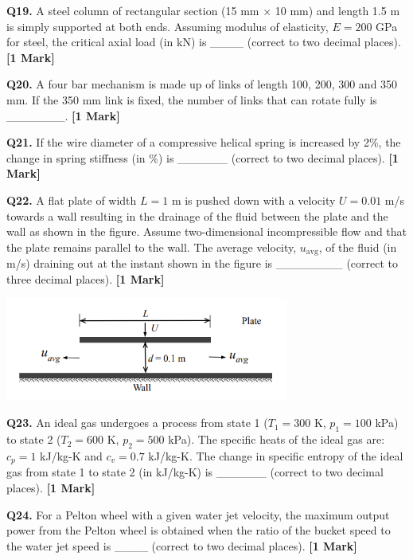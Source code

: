 \documentclass[11pt]{article}
\newcommand{\questiona}[2]{
    \noindent\textbf{Q#2.} #1 \hfill \textbf{[1 Mark]}
}
\begin{document}
\questiona{A steel column of rectangular section (15 mm × 10 mm) and length 1.5 m is simply supported at both ends. Assuming modulus of elasticity, \( E = 200 \) GPa for steel, the critical axial load (in kN) is \_\_\_\_ (correct to two decimal places).}{19}
\vspace{0.5cm}

\questiona{A four bar mechanism is made up of links of length 100, 200, 300 and 350 mm. If the 350 mm link is fixed, the number of links that can rotate fully is \_\_\_\_\_\_\_.}{20}
\vspace{0.5cm}

\questiona{If the wire diameter of a compressive helical spring is increased by 2\%, the change in spring stiffness (in \%) is \_\_\_\_\_\_ (correct to two decimal places).}{21}
\vspace{0.5cm}

\questiona{A flat plate of width \( L = 1 \) m is pushed down with a velocity \( U = 0.01 \) m/s towards a wall resulting in the drainage of the fluid between the plate and the wall as shown in the figure. Assume two-dimensional incompressible flow and that the plate remains parallel to the wall. The average velocity, \( u_{\text{avg}} \), of the fluid (in m/s) draining out at the instant shown in the figure is \_\_\_\_\_\_\_\_ (correct to three decimal places).}{22}
\begin{center}
\includegraphics[width=0.7\textwidth]{figures/22.png}
\end{center}
\vspace{0.5cm}

\questiona{An ideal gas undergoes a process from state 1 (\( T_1 = 300 \) K, \( p_1 = 100 \) kPa) to state 2 (\( T_2 = 600 \) K, \( p_2 = 500 \) kPa). The specific heats of the ideal gas are: \( c_p = 1 \) kJ/kg-K and \( c_v = 0.7 \) kJ/kg-K. The change in specific entropy of the ideal gas from state 1 to state 2 (in kJ/kg-K) is \_\_\_\_\_\_ (correct to two decimal places).}{23}
\vspace{0.5cm}

\questiona{For a Pelton wheel with a given water jet velocity, the maximum output power from the Pelton wheel is obtained when the ratio of the bucket speed to the water jet speed is \_\_\_\_ (correct to two decimal places).}{24}
\vspace{0.5cm}
\end{document}
